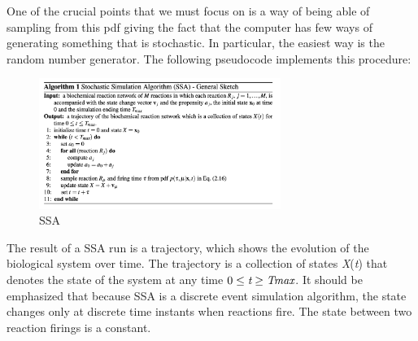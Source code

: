 One of the crucial points that we must focus on is a way of being able
of sampling from this pdf giving the fact that the computer has few ways
of generating something that is stochastic. In particular, the easiest
way is the random number generator. The following pseudocode implements
this procedure:

\begin{figure}
\centering
\includegraphics[width=0.7\textwidth]{02_images/SSA_algo.png}
\caption{SSA}
\end{figure}

The result of a SSA run is a trajectory, which shows the evolution of
the biological system over time. The trajectory is a collection of
states \emph{X}(\emph{t}) that denotes the state of the system at any
time $0 \leq \emph{t} \geq \emph{Tmax}$. It should be emphasized that because
SSA is a discrete event simulation algorithm, the state changes only at
discrete time instants when reactions fire. The state between two
reaction firings is a constant.
